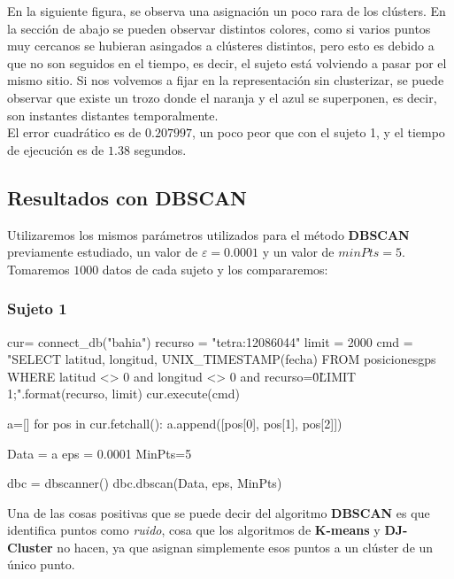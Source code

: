 \documentclass[a4paper, 12pt, spanish]{article}
\begin{document}
En la siguiente figura, se observa una asignaci\'on un poco rara de los cl\'usters. En la secci\'on de abajo se pueden observar distintos colores, como si varios puntos muy cercanos se hubieran asingados a cl\'usteres distintos, pero esto es debido a que no son seguidos en el tiempo, es decir, el sujeto est\'a volviendo a pasar por el mismo sitio. Si nos volvemos a fijar en la representaci\'on sin clusterizar, se puede observar que existe un trozo donde el naranja y el azul se superponen, es decir, son instantes distantes temporalmente.\\

El error cuadr\'atico es de $0.207997$, un poco peor que con el sujeto 1, y el tiempo de ejecuci\'on es de $1.38$ segundos.\\

\pagebreak
\subsection{Resultados con DBSCAN}

Utilizaremos los mismos par\'ametros utilizados para el m\'etodo \textbf{DBSCAN} previamente estudiado, un valor de $\varepsilon = 0.0001$ y un valor de $minPts = 5$. Tomaremos $1000$ datos de cada sujeto y los compararemos:\\

\subsubsection{Sujeto 1}

\begin{python}
cur= connect_db("bahia")
recurso = "tetra:12086044"
limit = 2000
cmd = "SELECT latitud, longitud, UNIX_TIMESTAMP(fecha) 
	FROM posicionesgps 
	WHERE latitud <> 0 and longitud <> 0 and recurso=\"{0}\" 
	LIMIT {1};".format(recurso, limit)
cur.execute(cmd)

a=[]
for pos in cur.fetchall():
    a.append([pos[0], pos[1], pos[2]])

Data = a
eps = 0.0001
MinPts=5

dbc = dbscanner()
dbc.dbscan(Data, eps, MinPts)
\end{python}

\bigskip

Una de las cosas positivas que se puede decir del algoritmo \textbf{DBSCAN} es que identifica puntos como \textit{ruido}, cosa que los algoritmos de \textbf{K-means} y \textbf{DJ-Cluster} no hacen, ya que asignan simplemente esos puntos a un cl\'uster de un \'unico punto.\\
\end{document}
